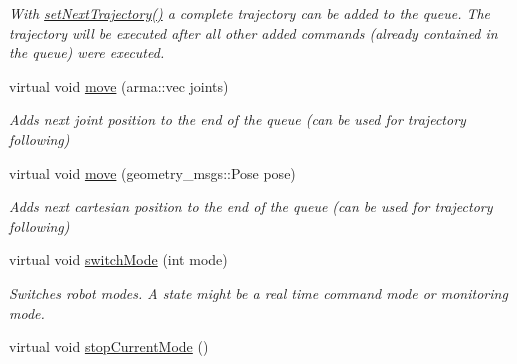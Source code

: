 \begin{DoxyCompactItemize}
\begin{DoxyCompactList}\small\item\em With \hyperlink{classkukadu_1_1ControlQueue_a0025c5c010a1b33d637e52fb24f767b2}{set\+Next\+Trajectory()} a complete trajectory can be added to the queue. The trajectory will be executed after all other added commands (already contained in the queue) were executed. \end{DoxyCompactList}\item 
virtual void \hyperlink{classkukadu_1_1ControlQueue_aca70a978b2950d7c9ab99d55c5977eec}{move} (arma\+::vec joints)
\begin{DoxyCompactList}\small\item\em Adds next joint position to the end of the queue (can be used for trajectory following) \end{DoxyCompactList}\item 
virtual void \hyperlink{classkukadu_1_1ControlQueue_a62b3e0c02b1937b09ae538a71ee0e855}{move} (geometry\+\_\+msgs\+::\+Pose pose)
\begin{DoxyCompactList}\small\item\em Adds next cartesian position to the end of the queue (can be used for trajectory following) \end{DoxyCompactList}\item 
virtual void \hyperlink{classkukadu_1_1ControlQueue_a5defe63d9f1b9829676f9a31a4683911}{switch\+Mode} (int mode)
\begin{DoxyCompactList}\small\item\em Switches robot modes. A state might be a real time command mode or monitoring mode. \end{DoxyCompactList}\item 
virtual void \hyperlink{classkukadu_1_1ControlQueue_ae4236dc4c31aff57d2295dd11dbf453b}{stop\+Current\+Mode} ()\hypertarget{classkukadu_1_1ControlQueue_ae4236dc4c31aff57d2295dd11dbf453b}{}\label{classkukadu_1_1ControlQueue_ae4236dc4c31aff57d2295dd11dbf453b}


\end{DoxyCompactItemize}

